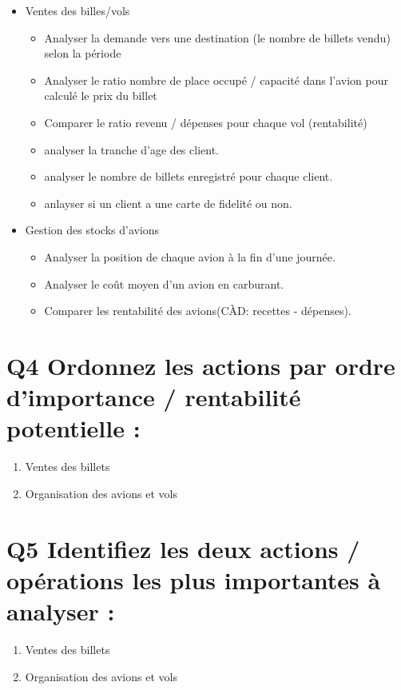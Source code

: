 \documentclass[oneside,13pt,a4paper]{article}
\begin{document}
\begin{itemize}
  \item Ventes des billes/vols
        \begin{itemize}
          \item Analyser la demande vers une destination (le nombre de billets vendu) selon la période
          \item Analyser le ratio nombre de place occupé / capacité dans l'avion pour calculé le prix du billet
          \item Comparer le ratio revenu / dépenses pour chaque vol (rentabilité)
          \item analyser la tranche d'age des client.
          \item analyser le nombre de billets enregistré pour chaque client.
          \item anlayser si un client a une carte de fidelité ou non.
        \end{itemize}
\end{itemize}
\begin{itemize}
  \item Gestion des stocks d'avions
        \begin{itemize}
          \item Analyser la position de chaque avion à la fin d'une journée.
          \item Analyser le coût moyen d'un avion en carburant.
          \item Comparer les rentabilité des avions(CÀD: recettes - dépenses).
        \end{itemize}
\end{itemize}
 
\section{Q4 Ordonnez les actions par ordre d’importance / rentabilité potentielle : }
\begin{enumerate}
  \item Ventes des billets
  \item Organisation des avions et vols
\end{enumerate} 

\section{Q5 Identifiez les deux actions / opérations les plus importantes à analyser : }

\begin{enumerate}
  \item Ventes des billets
  \item Organisation des avions et vols
\end{enumerate}
\end{document}
